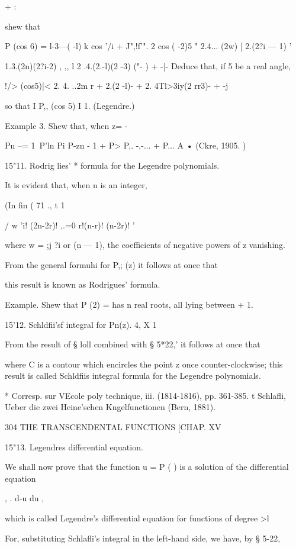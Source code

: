 + :



shew that

P (cos 6) = l-3---( -l) k cos '/i + J",!f'". 2 cos ( -2)5 " 2.4...
(2w) [ 2.(2?i — 1) '

1.3.(2n)(2?i-2) , ,, l 2 .4.(2.-l)(2 -3) ("- ) + -|- Deduce that, if 5
be a real angle,

!/> (cos5)|< 2. 4. ..2m r + 2.(2 -l)- + 2. 4Tl>3iy(2 rr3)- + -j

so that I P,, (cos 5) I 1. (Legendre.)

Example 3. Shew that, when z= -\,

Pn --= 1\ P'ln Pi P-zn - 1 + P> P,. -,-... + P... A • (Ckre, 1905. )

15"11. Rodrig lies' * formula for the Legendre polynomials.

It is evident that, when n is an integer,

(In fin ( 71 ., t 1

  / w 'i! (2n-2r)! ,.=0 r!(n-r)! (n-2r)! '

where w = ;j ?i or (n — 1), the coefficients of negative powers of z
vanishing.

From the general formuhi for P,; (z) it follows at once that

this result is known as Rodrigues' formula.

Example. Shew that P (2) = has n real roots, all lying between + 1.

15'12. Schldfii'sf integral for Pn(z). 4, X 1

From the result of § loll combined with § 5*22,' it follows at once
that

where C is a contour which encircles the point z once
counter-clockwise; this result is called Schldfiis integral formula
for the Legendre polynomials.

* Corresp. sur VEcole poly technique, iii. (1814-1816), pp. 361-385. t
Schlafli, Ueber die zwei Heine'schen Kngelfunctionen (Bern, 1881).



304 THE TRANSCENDENTAL FUNCTIONS [CHAP. XV

15"13. Legendres differential equation.

We shall now prove that the function u = P ( ) is a solution of the
differential equation

, . d-u du ,

which is called Legendre's differential equation for functions of
degree >l

For, substituting Schlafli's integral in the left-hand side, we have,
by § 5-22,

